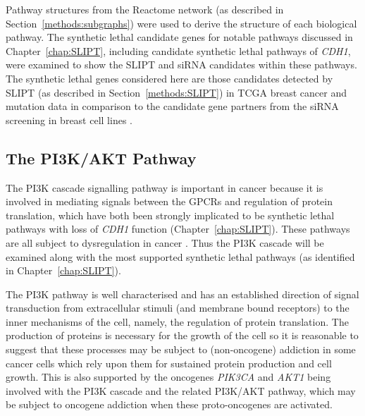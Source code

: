 Pathway structures from the Reactome network (as described in Section~\ref{methods:subgraphs}) were used to derive the  structure of each biological \gls{pathway}. The \gls{synthetic lethal} candidate genes for notable \glspl{pathway} discussed in Chapter~\ref{chap:SLIPT}, including candidate \gls{synthetic lethal} \glspl{pathway} of \textit{CDH1}, were examined to show the \gls{SLIPT} and \gls{siRNA} candidates within these \glspl{pathway}. The \gls{synthetic lethal} genes considered here are those candidates detected by \gls{SLIPT} (as described in Section~\ref{methods:SLIPT}) in \gls{TCGA} breast cancer  and \gls{mutation} data \citep{TCGA2012} in comparison to the candidate gene partners from the \gls{siRNA} screening in breast cell lines \citep{Telford2015}. 

\FloatBarrier

\subsection{The PI3K/AKT Pathway}  \label{chapt4:SL_Genes_PI3K}

\FloatBarrier

The \acrfull{PI3K} cascade signalling \gls{pathway} is important in cancer because it is involved in mediating signals between the \glspl{GPCR} and regulation of protein translation, which have both been strongly implicated to be \gls{synthetic lethal} \glspl{pathway} with loss of \textit{CDH1} function (Chapter~\ref{chap:SLIPT}). These \glspl{pathway} are all subject to dysregulation in cancer \citep{Dorsam2007, Courtney2010, Gao2015}. Thus the PI3K cascade will be examined along with the most supported \gls{synthetic lethal} \glspl{pathway} (as identified in Chapter~\ref{chap:SLIPT}). %

The PI3K \gls{pathway} is well characterised and has an established direction of signal transduction from extracellular stimuli (and membrane bound receptors) to the inner mechanisms of the cell, namely, the regulation of protein translation. The production of proteins is necessary for the growth of the cell so it is reasonable to suggest that these processes may be subject to (non-\gls{oncogene}) addiction in some cancer cells which rely upon them for sustained protein production and cell growth. This is also supported by the \glspl{oncogene} \textit{PIK3CA} and \textit{AKT1} being involved with the PI3K cascade and the related PI3K/AKT \gls{pathway}, which may be subject to \gls{oncogene addiction} when these proto-oncogenes are activated.

